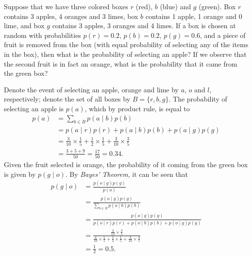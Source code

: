 \begin{question}{1.3}
	Suppose that we have three colored boxes $r$ (red), $b$ (blue) and $g$ (green). Box $r$ contains 3 apples, 4 oranges and 3 limes, box $b$ contains 1 apple, 1 orange and 0 lime, and box $g$ contains 3 apples, 3 oranges and 4 limes. If a box is chosen at random with probabilities $p(r)=0.2$, $p(b) = 0.2$, $p(g)=0.6$, and a piece of fruit is removed from the box (with equal probability of selecting any of the items in the box), then what is the probability of selecting an apple? If we observe that the second fruit is in fact an orange, what is the probability that it came from the green box?
\end{question}

\begin{answer}{}
	Denote the event of selecting an apple, orange and lime by $a$, $o$ and $l$, respectively; denote the set of all boxes by $B= \{r, b, g\}$. The probability of selecting an apple is $p(a)$, which by product rule, is equal to
	\begin{align}
		p(a) &= \sum_{b \in B} p(a \mid b)p(b)\\
		&= p(a \mid r)p(r) + p(a \mid b)p(b) + p(a \mid g)p(g)\\
		&= \frac{3}{10}\times\frac{1}{5} + \frac{1}{2}\times\frac{1}{5} + \frac{3}{10}\times\frac{3}{5}\\
		&= \frac{3 + 5 + 9}{50} = \frac{17}{50} = 0.34.
	\end{align}
	Given the fruit selected is orange, the probability of it coming from the green box is given by $p(g \mid o)$. By \emph{Bayes' Theorem}, it can be seen that
	\begin{align}
		p(g \mid o) &= \frac{p(o \mid g)p(g)}{p(o)}\\
		&= \frac{p(o \mid g)p(g)}{\sum_{b \in B} p(o \mid b)p(b)}\\
		&= \frac{p(o \mid g)p(g)}{p(o \mid r)p(r) + p(o \mid b)p(b) + p(o \mid g)p(g)}\\
		&= \frac{\frac{3}{10}\times\frac{3}{5}}{\frac{4}{10}\times\frac{1}{5} + \frac{1}{2}\times\frac{1}{5} + \frac{3}{10}\times\frac{3}{5}}\\
		&= \frac{1}{2} = 0.5.
	\end{align}
\end{answer}